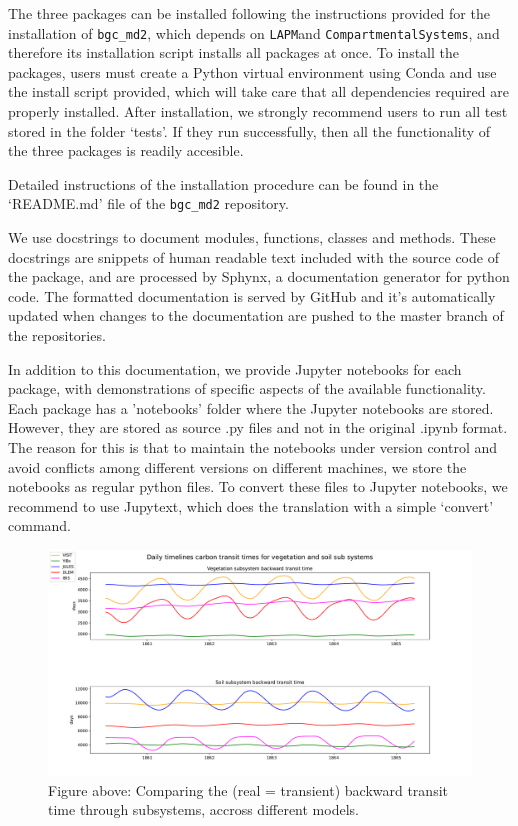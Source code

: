 \documentclass[a4paper]{article}
\newcommand{\LAPM}{\texttt{LAPM}}
\newcommand{\CompartmentalSystems}{\texttt{CompartmentalSystems}}
\begin{document}
The three packages can be installed following the instructions provided for the installation of \texttt{bgc\_md2}, which depends on \LAPM and \CompartmentalSystems, and therefore its installation script installs all packages at once. 
To install the packages, users must create a Python virtual environment using Conda and use the install script provided, which will take care that all dependencies required are properly installed. 
After installation, we strongly recommend users to run all test stored in the folder `tests'. If they run successfully, then all the functionality of the three packages is readily accesible. 

Detailed instructions of the installation procedure can be found in the `README.md' file of the \texttt{bgc\_md2} repository. 

We use docstrings to document modules, functions, classes and methods. These docstrings are snippets of human readable text included with the source code of the package, and are processed by Sphynx, a documentation generator for python code.  The formatted documentation is served by GitHub and it's automatically updated when changes to the documentation are pushed to the master branch of the repositories. 

In addition to this documentation, we provide Jupyter notebooks for each package, with demonstrations of specific aspects of the available functionality.
Each package has a 'notebooks' folder where the Jupyter notebooks are stored. However, they are stored as source .py files and not in the original .ipynb format. 
The reason for this is that to maintain the notebooks under version control and avoid conflicts among different versions on different machines, we store the notebooks as regular python files. To convert these files to Jupyter notebooks, we recommend to use Jupytext, which does the translation with a simple `convert' command. 
\begin{figure}[t]
	\includegraphics[width=\columnwidth]{test_veg_soil.pdf}
  \caption{
  Figure above: Comparing the (real = transient) backward transit time through 
  subsystems, accross different models. 
  }
\end{figure}  
\end{document}
